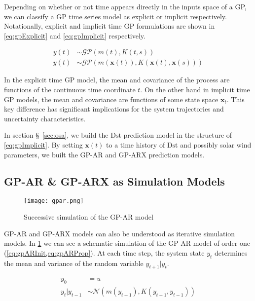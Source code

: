 Depending on whether or not time appears directly in the inputs space of a GP, we can classify a GP time series model as explicit or 
implicit respectively. Notationally, explicit and implicit time GP formulations are shown in \cref{eq:gpExplicit} and \cref{eq:gpImplicit} respectively.

\begin{align}
    y(t) &\sim \mathcal{GP}(m(t), K(t, s)) \label{eq:gpExplicit}\\
    y(t) &\sim \mathcal{GP}(m(\mathbf{x}(t)), K(\mathbf{x}(t), \mathbf{x}(s))) \label{eq:gpImplicit}
\end{align}

In the explicit time GP model, the mean and covariance of the process are functions of the continuous time 
coordinate $t$. On the other hand in implicit time GP models, the mean and covariance are functions of some 
state space $\mathbf{x}_t$. This key difference has significant implications for the system trajectories and 
uncertainty characteristics.

In section \S~\ref{sec:osa}, we build the $\mathrm{Dst}$ prediction model in the structure of \cref{eq:gpImplicit}. 
By setting $\mathbf{x}(t)$ to a time history of $\mathrm{Dst}$ and possibly solar wind parameters, we built the 
GP-AR and GP-ARX prediction models.

\subsection*{GP-AR \& GP-ARX as Simulation Models}

\begin{figure}
    \centering
    \noindent\texttt{[image: gpar.png]}
    \caption{Successive simulation of the GP-AR model}
    \label{fig:gparDiag}
\end{figure}

GP-AR and GP-ARX models can also be understood as iterative simulation models. In \cref{fig:gparDiag} we can 
see a schematic simulation of the GP-AR model of order one (\cref{eq:gpARInit,eq:gpARProp}). At each time step, 
the system state $y_t$ determines the mean and variance of the random variable $y_{t+1} \rvert y_t$.

\begin{align}
    y_0 &= u \label{eq:gpARInit}\\
    y_t \rvert y_{t-1} &\sim \mathcal{N}(m(y_{t - 1}), K(y_{t - 1}, y_{t - 1})) \label{eq:gpARProp}
\end{align}

